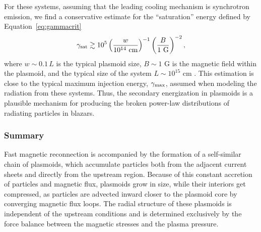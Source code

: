 
For these systems, assuming that the leading cooling mechanism is synchrotron emission, we find a conservative estimate for the ``saturation'' energy defined by Equation~\eqref{eq:gammacrit}
\begin{equation}
    \gamma_{\rm sat}\gtrsim 
        10^5 \left(\frac{w}{10^{14}~\text{cm}}\right)^{-1}
                \left(\frac{B}{1~\text{G}}\right)^{-2},
\end{equation}
where  $w\sim 0.1\, L$ is the typical plasmoid size, $B\sim 1$ G is the magnetic field within the plasmoid, and the typical size of the system $L\sim 10^{15}$ cm \citep[see, e.g.,][]{2008MNRAS.385..283C}. This estimation is close to the typical maximum injection energy, $\gamma_{\rm max}$, assumed when modeling the radiation from these systems. Thus, the secondary energization in plasmoids is a plausible mechanism for producing the broken power-law distributions of radiating particles in blazars.




\subsubsection*{Summary}
Fast magnetic reconnection is accompanied by the formation of a self-similar chain of plasmoids, which accumulate particles both from the adjacent current sheets and directly from the upstream region. Because of this constant accretion of particles and magnetic flux, plasmoids grow in size, while their interiors get compressed, as particles are advected inward closer to the plasmoid core by converging magnetic flux loops. The radial structure of these plasmoids is independent of the upstream conditions and is determined exclusively by the force balance between the magnetic stresses and the plasma pressure.

